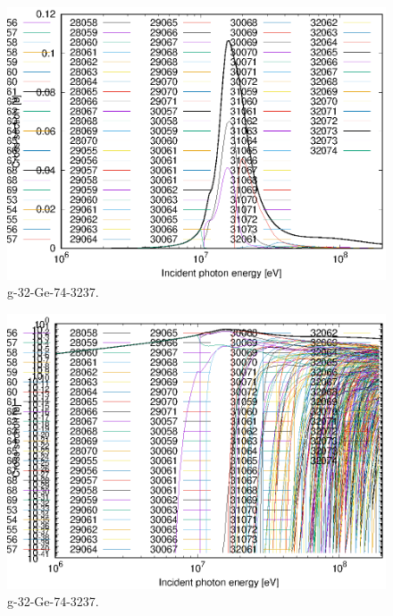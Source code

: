 \begin{figure}
 \includegraphics[width=\linewidth]{eps/g_32-Ge-74_3237.eps}
  \caption{g-32-Ge-74-3237.}
\end{figure}
\begin{figure}
 \includegraphics[width=\linewidth]{eps-log/g_32-Ge-74_3237.eps}
 \caption{g-32-Ge-74-3237.}
\end{figure}
\newpage \clearpage

